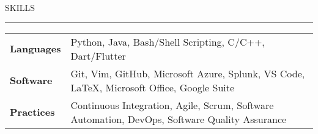 \documentclass[letter,11pt]{article}
\begin{document}
SKILLS

\vspace*{-1.25em}
\rule{\textwidth}{1.2pt}

\begin{tabular}{@{}p{2.25cm}l}
    \textbf{Languages} &Python, Java, Bash/Shell Scripting, C/C++, Dart/Flutter \\
    \textbf{Software} &Git, Vim, GitHub, Microsoft Azure, Splunk, VS Code, LaTeX, Microsoft Office, Google Suite \\
    \textbf{Practices} &Continuous Integration, Agile, Scrum, Software Automation, DevOps, Software Quality Assurance
\end{tabular}
\end{document}
